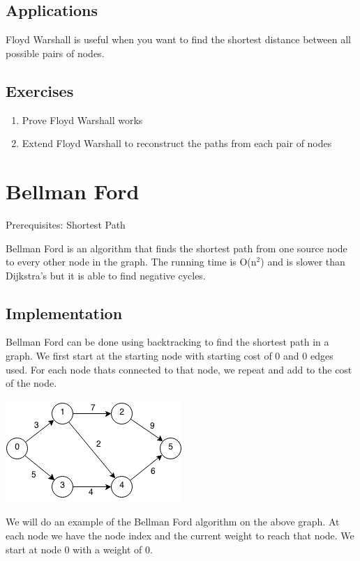 \documentclass[11pt,oneside]{book}
\makeatletter
\def\maxwidth#1{\ifdim\Gin@nat@width>#1 #1\else\Gin@nat@width\fi}
\makeatother
\begin{document}
\subsection{Applications}

Floyd Warshall is useful when you want to find the shortest distance between all possible pairs of nodes.

\subsection{Exercises}

\begin{enumerate}
\item Prove Floyd Warshall works
\item Extend Floyd Warshall to reconstruct the paths from each pair of nodes
\end{enumerate}
\section{Bellman Ford}

Prerequisites:  Shortest Path

Bellman Ford is an algorithm that finds the shortest path from one source node to every other node in the graph. The running time is O(n$^{2}$) and is slower than Dijkstra's but it is able to find negative cycles.

\subsection{Implementation}

Bellman Ford can be done using backtracking to find the shortest path in a graph. We first start at the starting node with starting cost of 0 and 0 edges used. For each node thats connected to that node, we repeat and add to the cost of the node.

\includegraphics[width=\maxwidth{\textwidth}]{bellmanford.png}

We will do an example of the Bellman Ford algorithm on the above graph. At each node we have the node index and the current weight to reach that node. We start at node 0 with a weight of 0.
\end{document}

